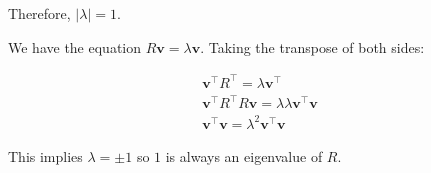 \documentclass[12pt]{article}
\begin{document}
Therefore, $\left\lvert \lambda \right\rvert = 1$.

We have the equation $R \mathbf{v} = \lambda \mathbf{v}$. Taking the transpose of both sides:

\begin{equation}
    \begin{split}
        \mathbf{v}^{\intercal} R^{\intercal} = \lambda \mathbf{v}^{\intercal} \\
        \mathbf{v}^{\intercal} R^{\intercal} R \mathbf{v} = \lambda \lambda \mathbf{v}^{\intercal} \mathbf{v} \\
        \mathbf{v}^{\intercal} \mathbf{v} = \lambda^{2} \mathbf{v}^{\intercal} \mathbf{v}
    \end{split}
\end{equation}

This implies $\lambda = \pm 1$ so $1$ is always an eigenvalue of $R$.

\end{document}
